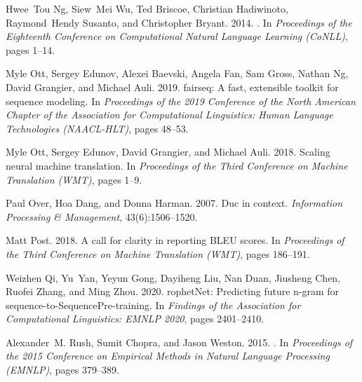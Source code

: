 \documentclass[11pt]{article}
\begin{document}
\begin{thebibliography}{47}
Hwee~Tou Ng, Siew~Mei Wu, Ted Briscoe, Christian Hadiwinoto, Raymond~Hendy
  Susanto, and Christopher Bryant. 2014.
.
\newblock In \emph{Proceedings of the Eighteenth Conference on Computational
  Natural Language Learning (CoNLL)}, pages 1--14.

Myle Ott, Sergey Edunov, Alexei Baevski, Angela Fan, Sam Gross, Nathan Ng,
  David Grangier, and Michael Auli. 2019.
\newblock fairseq: A fast, extensible toolkit for sequence modeling.
\newblock In \emph{Proceedings of the 2019 Conference of the North {A}merican
  Chapter of the Association for Computational Linguistics: Human Language
  Technologies (NAACL-HLT)}, pages 48--53.

Myle Ott, Sergey Edunov, David Grangier, and Michael Auli. 2018.
\newblock Scaling neural machine translation.
\newblock In \emph{Proceedings of the Third Conference on Machine Translation
  (WMT)}, pages 1--9.

Paul Over, Hoa Dang, and Donna Harman. 2007.
\newblock Duc in context.
\newblock \emph{Information Processing \& Management}, 43(6):1506--1520.

Matt Post. 2018.
\newblock A call for clarity in reporting {BLEU} scores.
\newblock In \emph{Proceedings of the Third Conference on Machine Translation
  (WMT)}, pages 186--191.

Weizhen Qi, Yu~Yan, Yeyun Gong, Dayiheng Liu, Nan Duan, Jiusheng Chen, Ruofei
  Zhang, and Ming Zhou. 2020.
rophet{N}et: Predicting future n-gram for
  sequence-to-{S}equence{P}re-training.
\newblock In \emph{Findings of the Association for Computational Linguistics:
  EMNLP 2020}, pages 2401--2410.

Alexander~M. Rush, Sumit Chopra, and Jason Weston. 2015.
.
\newblock In \emph{Proceedings of the 2015 Conference on Empirical Methods in
  Natural Language Processing (EMNLP)}, pages 379--389.


\end{thebibliography}
\end{document}
